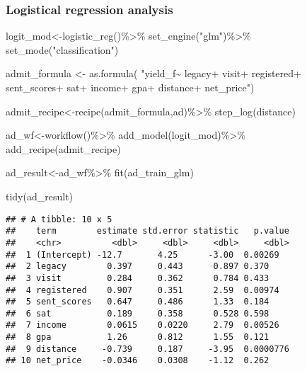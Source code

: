 \documentclass[
]{article}
\newenvironment{Shaded}{\begin{snugshade}}{\end{snugshade}}
\newcommand{\FunctionTok}[1]{\textcolor[rgb]{0.00,0.00,0.00}{#1}}
\newcommand{\NormalTok}[1]{#1}
\newcommand{\OtherTok}[1]{\textcolor[rgb]{0.56,0.35,0.01}{#1}}
\newcommand{\SpecialCharTok}[1]{\textcolor[rgb]{0.00,0.00,0.00}{#1}}
\newcommand{\StringTok}[1]{\textcolor[rgb]{0.31,0.60,0.02}{#1}}
\begin{document}
\hypertarget{logistical-regression-analysis}{%
\subsubsection{Logistical regression
analysis}\label{logistical-regression-analysis}}

\begin{Shaded}
\begin{Highlighting}[]
\NormalTok{logit\_mod}\OtherTok{\textless{}{-}}\FunctionTok{logistic\_reg}\NormalTok{()}\SpecialCharTok{\%\textgreater{}\%}
  \FunctionTok{set\_engine}\NormalTok{(}\StringTok{"glm"}\NormalTok{)}\SpecialCharTok{\%\textgreater{}\%}
  \FunctionTok{set\_mode}\NormalTok{(}\StringTok{"classification"}\NormalTok{)}

\NormalTok{admit\_formula }\OtherTok{\textless{}{-}} \FunctionTok{as.formula}\NormalTok{(}
                  \StringTok{"yield\_f\textasciitilde{}}
\StringTok{                          legacy+}
\StringTok{                          visit+}
\StringTok{                          registered+}
\StringTok{                          sent\_scores+}
\StringTok{                          sat+}
\StringTok{                          income+}
\StringTok{                          gpa+}
\StringTok{                          distance+}
\StringTok{                          net\_price"}\NormalTok{)}

\NormalTok{admit\_recipe}\OtherTok{\textless{}{-}}\FunctionTok{recipe}\NormalTok{(admit\_formula,ad)}\SpecialCharTok{\%\textgreater{}\%}
  \FunctionTok{step\_log}\NormalTok{(distance)}

\NormalTok{ad\_wf}\OtherTok{\textless{}{-}}\FunctionTok{workflow}\NormalTok{()}\SpecialCharTok{\%\textgreater{}\%}
  \FunctionTok{add\_model}\NormalTok{(logit\_mod)}\SpecialCharTok{\%\textgreater{}\%}
  \FunctionTok{add\_recipe}\NormalTok{(admit\_recipe)}

\NormalTok{ad\_result}\OtherTok{\textless{}{-}}\NormalTok{ad\_wf}\SpecialCharTok{\%\textgreater{}\%}
  \FunctionTok{fit}\NormalTok{(ad\_train\_glm)}

\FunctionTok{tidy}\NormalTok{(ad\_result)}
\end{Highlighting}
\end{Shaded}

\begin{verbatim}
## # A tibble: 10 x 5
##    term        estimate std.error statistic   p.value
##    <chr>          <dbl>     <dbl>     <dbl>     <dbl>
##  1 (Intercept) -12.7       4.25      -3.00  0.00269  
##  2 legacy        0.397     0.443      0.897 0.370    
##  3 visit         0.284     0.362      0.784 0.433    
##  4 registered    0.907     0.351      2.59  0.00974  
##  5 sent_scores   0.647     0.486      1.33  0.184    
##  6 sat           0.189     0.358      0.528 0.598    
##  7 income        0.0615    0.0220     2.79  0.00526  
##  8 gpa           1.26      0.812      1.55  0.121    
##  9 distance     -0.739     0.187     -3.95  0.0000776
## 10 net_price    -0.0346    0.0308    -1.12  0.262
\end{verbatim}
\end{document}
